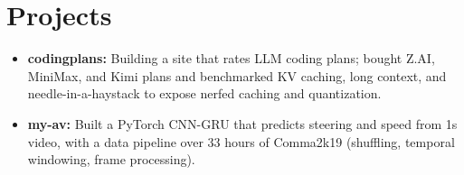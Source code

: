 \documentclass[11pt, letterpaper]{article}
\begin{document}
\section{Projects}
\begin{itemize}
  \item \textbf{codingplans:} Building a site that rates LLM coding plans; bought Z.AI, MiniMax, and Kimi plans and benchmarked KV caching, long context, and needle-in-a-haystack to expose nerfed caching and quantization.
  \item \textbf{my-av:} Built a PyTorch CNN-GRU that predicts steering and speed from 1s video, with a data pipeline over 33 hours of Comma2k19 (shuffling, temporal windowing, frame processing).
\end{itemize}
\end{document}

